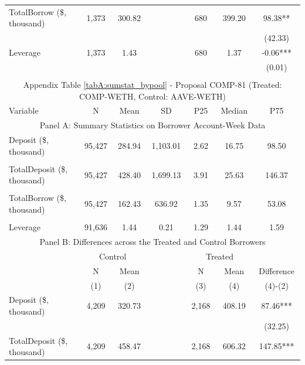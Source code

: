 \begin{table}[ht!]
\begin{tabular*}{\linewidth}{@{\extracolsep{\fill}}lcccccc }
    TotalBorrow (\$, thousand) & 1,373 & 300.82 &       & 680   & 399.20 & 98.38** \\
          &       &       &       &       &       & (42.33) \\
    Leverage & 1,373 & 1.43  &       & 680   & 1.37  & -0.06*** \\
          &       &       &       &       &       & (0.01) \\
    \bottomrule
                  &       &       &       &       &       &  \\
      \multicolumn{7}{c}{Appendix Table \ref{tabA:sumstat_bypool} - Proposal COMP-81 (Treated: COMP-WETH, Control: AAVE-WETH)} \\
          \toprule
     Variable  &N & Mean & SD & P25 & Median & P75 \\
     \midrule
    \multicolumn{7}{c}{Panel A: Summary Statistics on Borrower Account-Week Data} \\
    \midrule
    Deposit (\$, thousand) & 95,427 & 284.94 & 1,103.01 & 2.62  & 16.75 & 98.50 \\
          &       &       &       &       &       &  \\
    TotalDeposit (\$, thousand) & 95,427 & 428.40 & 1,699.13 & 3.91  & 25.63 & 146.37 \\
          &       &       &       &       &       &  \\
    TotalBorrow (\$, thousand) & 95,427 & 162.43 & 636.92 & 1.35  & 9.57  & 53.08 \\
          &       &       &       &       &       &  \\
    Leverage & 91,636 & 1.44  & 0.21  & 1.29  & 1.44  & 1.59 \\
    \midrule
        \multicolumn{7}{c}{Panel B: Differences across the Treated and Control Borrowers} \\
\midrule
          & \multicolumn{2}{c}{Control} &       & \multicolumn{2}{c}{Treated} &  \\
\cmidrule{2-3}\cmidrule{5-6}          & N & Mean &       & N & Mean & Difference \\
\cmidrule{2-3}\cmidrule{5-6}          & (1) & (2) &       & (3) & (4) & (4)-(2) \\
\cmidrule{2-7}    Deposit (\$, thousand) & 4,209 & 320.73 &       & 2,168 & 408.19 & 87.46*** \\
          &       &       &       &       &       & (32.25) \\
    TotalDeposit (\$, thousand) & 4,209 & 458.47 &       & 2,168 & 606.32 & 147.85*** \\

\end{tabular*}
\end{table}
